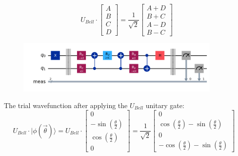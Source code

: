 \documentclass{article}
\begin{document}
\begin{itemize}
	      \begin{equation*}
		      U_{Bell} \cdot \begin{bmatrix}
			      A \\
			      B \\
			      C \\
			      D
		      \end{bmatrix}
		      =
		      \frac{1}{\sqrt{2}}\begin{bmatrix}
			      A + D \\
			      B + C \\
			      A - D \\
			      B - C
		      \end{bmatrix}
	      \end{equation*}
	      \begin{figure}[H]
		      \centering
		      \includegraphics[width=0.9\textwidth, height=0.25\textheight]{BellM.png}
	      \end{figure}
	      The trial wavefunction after applying the \(U_{Bell}\) unitary gate:
	      \begin{equation*}
		      U_{Bell} \cdot |\phi(\vec{\theta})\rangle = U_{Bell} \cdot \begin{bmatrix}
			      0                                  \\
			      -\sin\left(\frac{\theta}{2}\right) \\
			      \cos\left(\frac{\theta}{2}\right)  \\
			      0
		      \end{bmatrix}
		      = \frac{1}{\sqrt{2}}
		      \begin{bmatrix}
			      0                                                                     \\
			      \cos\left(\frac{\theta}{2}\right) - \sin\left(\frac{\theta}{2}\right) \\
			      0                                                                     \\
			      -\cos\left(\frac{\theta}{2}\right) - \sin\left(\frac{\theta}{2}\right)
		      \end{bmatrix}
		      \begin{array}{c}

\end{array}
\end{equation*}
\end{itemize}
\end{document}
